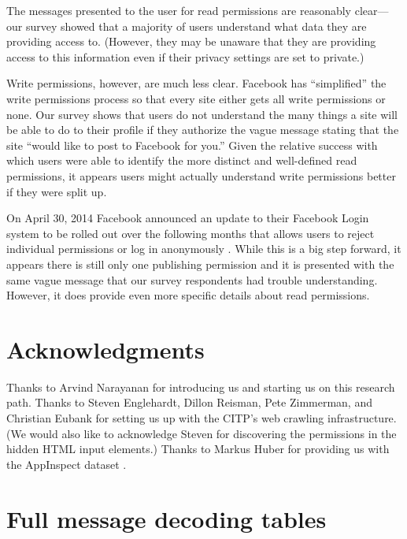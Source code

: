 \documentclass[10pt]{sig-alternate-10pt}
\begin{document}
The messages presented to the user for read permissions are reasonably clear---our survey showed that a majority of users understand what data they are providing access to. (However, they may be unaware that they are providing access to this information even if their privacy settings are set to private.)

Write permissions, however, are much less clear. Facebook has ``simplified'' the write permissions process so that every site either gets all write permissions or none. Our survey shows that users do not understand the many things a site will be able to do to their profile if they authorize the vague message stating that the site ``would like to post to Facebook for you.'' Given the relative success with which users were able to identify the more distinct and well-defined read permissions, it appears users might actually understand write permissions better if they were split up.

On April 30, 2014 Facebook announced an update to their Facebook Login system to be rolled out over the following months that allows users to reject individual permissions or log in anonymously \cite{newlogin}. While this is a big step forward, it appears there is still only one publishing permission and it is presented with the same vague message that our survey respondents had trouble understanding. However, it does provide even more specific details about read permissions. 

\section{Acknowledgments}

Thanks to Arvind Narayanan for introducing us and starting us on this research path. Thanks to Steven Englehardt, Dillon Reisman, Pete Zimmerman, and Christian Eubank for setting us up with the CITP's web crawling infrastructure. (We would also like to acknowledge Steven for discovering the permissions in the hidden HTML input elements.) Thanks to Markus Huber for providing us with the AppInspect dataset \cite{appinspect}.




\appendix
\section{Full message decoding tables}
\label{appendix:decodetables}
\end{document}
